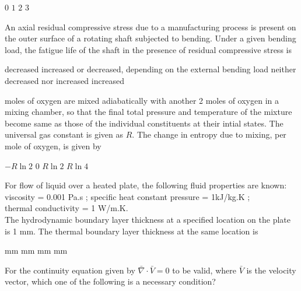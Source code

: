 \documentclass[addpoints,10pt]{exam}
\begin{document}
\begin{questions}
    \begin{oneparchoices}
        \choice $0$
        \choice $1$
        \choice $2$
        \choice $3$
    \end{oneparchoices}

    \question An axial residual compressive stress due to a manufacturing process is present on the outer surface of a rotating shaft subjected to bending. Under a given bending load, the fatigue life of the shaft in the presence of residual compressive stress is

    \begin{choices}
        \choice decreased
        \choice increased or decreased, depending on the external bending load
        \choice neither decreased nor increased
        \choice increased
    \end{choices}

     moles of oxygen are mixed adiabatically with another 2 moles of oxygen in a mixing chamber, so that the final total pressure and temperature of the mixture become same as those of the individual constituents at their intial states. The universal gas constant is given as $R$. The change in entropy due to mixing, per mole of oxygen, is given by

    \begin{oneparchoices}
        \choice $-R \ln2$
        \choice $0$
        \choice $R \ln 2$
        \choice $R\ln4$
    \end{oneparchoices}

    \question For flow of liquid over a heated plate, the following fluid properties are known:\\
    viscosity = 0.001 Pa.s ; specific heat constant pressure = 1kJ/kg.K ;\\
    thermal conductivity = 1 W/m.K.\\
    The hydrodynamic boundary layer thickness at a specified location on the plate is 1 mm. The thermal boundary layer thickness at the same location is

    \begin{oneparchoices}
         mm
         mm
         mm
         mm
    \end{oneparchoices}

    \pagebreak

    \question For the continuity equation given by $\bar{\nabla}\cdot\bar{V} = 0$ to be valid, where $\bar{V}$ is the velocity vector, which one of the following is a necessary condition?


\end{questions}
\end{document}
